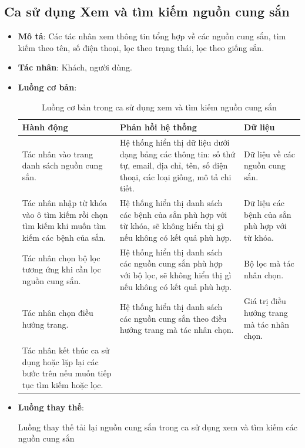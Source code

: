 \documentclass[./../main.tex]{subfiles}
\begin{document}
\subsection{Ca sử dụng Xem và tìm kiếm nguồn cung sắn}
\begin{itemize}
    \item \textbf{Mô tả}: Các tác nhân xem thông tin tổng hợp về các nguồn cung sắn, tìm kiếm theo tên, số điện thoại, lọc theo trạng thái, lọc theo giống sắn.
    \item \textbf{Tác nhân}: Khách, người dùng.
    \item \textbf{Luồng cơ bản}:
    \begin{table}[H]
    \caption{\label{uc-22}Luồng cơ bản trong ca sử dụng xem và tìm kiếm nguồn cung sắn}
    \begin{tabularx}{\textwidth}{| X | X | X |}
        \hline
        \textbf{Hành động} & \textbf{Phản hồi hệ thống} & \textbf{Dữ liệu} \\ \hline
        Tác nhân vào trang danh sách nguồn cung sắn. & Hệ thống hiển thị dữ liệu dưới dạng bảng các thông tin: số thứ tự, email, địa chỉ, tên, số điện thoại, các loại giống, mô tả chi tiết. & Dữ liệu về các nguồn cung sắn.
        \\ \hline
        Tác nhân nhập từ khóa vào ô tìm kiếm rồi chọn tìm kiếm khi muốn tìm kiếm các bệnh của sắn. & Hệ thống hiển thị danh sách các bệnh của sắn phù hợp với từ khóa, sẽ không hiển thị gì nếu không có kết quả phù hợp. & Dữ liệu các bệnh của sắn phù hợp với từ khóa.
        \\ \hline
        Tác nhân chọn bộ lọc tương ứng khi cần lọc nguồn cung sắn. & Hệ thống hiển thị danh sách các nguồn cung sắn phù hợp với bộ lọc, sẽ không hiển thị gì nếu không có kết quả phù hợp. & Bộ lọc mà tác nhân chọn.
        \\ \hline
        Tác nhân chọn điều hướng trang. & Hệ thống hiển thị danh sách các nguồn cung sắn theo điều hướng trang mà tác nhân chọn. & Giá trị điều hướng trang mà tác nhân chọn.
        \\ \hline
        Tác nhân kết thúc ca sử dụng hoặc lặp lại các bước trên nếu muốn tiếp tục tìm kiếm hoặc lọc. & &
        \\ \hline
    \end{tabularx}
    \end{table}    
    \item \textbf{Luồng thay thế}:
        \begin{table}[H]
        \caption{\label{uc-23}Luồng thay thế tải lại nguồn cung sắn trong ca sử dụng xem và tìm kiếm các nguồn cung sắn}

\end{table}
\end{itemize}
\end{document}
